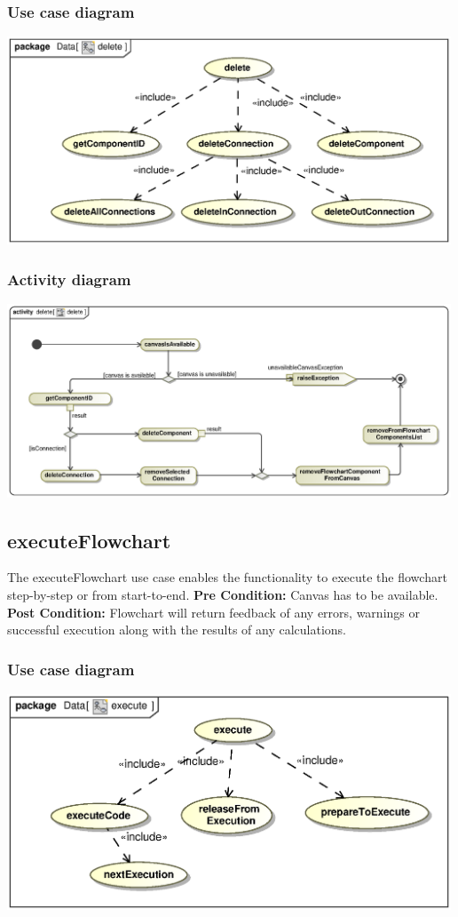 \documentclass[11pt,a4paper,titlepage]{article}
\begin{document}
\subsubsection{Use case diagram}
\includegraphics[width=500px]{delete.eps}

\subsubsection{Activity diagram}
\includegraphics[width=500px]{deleteAct.eps}

\subsection{executeFlowchart}
The executeFlowchart use case enables the functionality to execute the flowchart step-by-step or from start-to-end.
\newline\newline
\textbf{Pre Condition:} Canvas has to be available.
\newline\newline
\textbf{Post Condition:} Flowchart will return feedback of any errors, warnings or successful execution along with the results of any calculations.

\subsubsection{Use case diagram}
\includegraphics[width=500px]{execute.eps}
\end{document}
